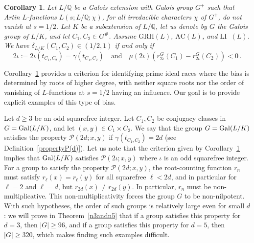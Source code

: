 \documentclass[12pt]{amsart}
\numberwithin{equation}{section}
\newcommand{\Gal}{{\rm Gal}}
\newcommand{\Q}{\mathbb Q}
\newtheorem{cor}[X]{Corollary}
\theoremstyle{definition}
\theoremstyle{remark}
\begin{document}
\begin{cor}\label{maincriterion}
    Let $L/\Q$ be a Galois extension with Galois group $G^+$ such that Artin $L$-functions $L(s;L/\Q;\chi)$, for all irreducible characters $\chi$ of $G^+$, do not vanish at $s=1/2$. Let $K$ be a subextension of $L/\Q$, let us denote by $G$ the Galois group of $L/K$, and let $C_1,C_2\in G^\#$. Assume $\mathrm{GRH}(L)$, $\mathrm{AC}(L)$, and $\mathrm{LI}^{-}(L)$. We have $\delta_{L/K}(C_1,C_2)\in (1/2,1) $ if and only if 
    \begin{equation}\label{eq-crit} 2\iota:=2\iota\left(t_{C_1,C_2}\right)=\gamma\left(t_{C_1,C_2}\right)\quad\text{and}\quad \mu(2\iota)\left(r_{2\iota}^G(C_1)-r_{2\iota}^G(C_2)\right)<0\, .\end{equation}
\end{cor}

Corollary~\ref{maincriterion} provides a criterion for identifying prime ideal races where the bias is determined by roots of higher degree, with neither square roots nor the order of vanishing of $L$-functions at $s=1/2$ having an influence. Our goal is to provide explicit examples of this type of bias.

Let $d\ge 3$ be an odd squarefree integer. Let $C_1,C_2$ be conjugacy classes in $G=\Gal(L/K)$, and let $(x,y)\in C_1\times C_2$. We say that the group $G=\Gal(L/K)$ satisfies the property $\mathcal{P}(2d;x,y)$ if $\gamma(t_{C_1,C_2})=2d$ (see Definition~\ref{propertyP(d)}). Let us note that the criterion given by Corollary~\ref{maincriterion} implies that $\Gal(L/K)$ satisfies $\mathcal{P}(2\iota;x,y)$ where $\iota$ is an odd squarefree integer. For a group to satisfy the property $\mathcal{P}(2d;x,y)$, the root-counting function $r_n$ must satisfy $r_\ell(x)=r_\ell(y)$ for all squarefree $\ell < 2d$, and in particular for $\ell=2$ and $\ell=d$, but $r_{2d}(x)\ne r_{2d}(y)$. In particular, $r_n$ must be non-multiplicative. This non-multiplicativity forces the group $G$ to be non-nilpotent. With such hypotheses, the order of such groups is relatively large even for small $d$: we will prove in Theorem~\ref{n3andn5} that if a group satisfies this property for $d=3$, then $|G|\ge 96$, and if a group satisfies this property for $d=5$, then $|G|\ge 320$, which makes finding such examples difficult. 
\end{document}
